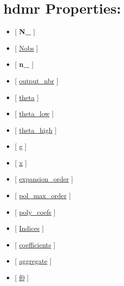 \documentclass[letterpaper,10pt,english]{sphinxmanual}
\begin{document}
\section{hdmr Properties:}
\label{classes/utils/@hdmr/hdmr:hdmr-properties}\begin{itemize}
\item {} 
{[} {\color{red}\bfseries{}N\_} {]}

\item {} 
{[} {\hyperref[classes/utils/@hdmr/hdmr:nobs]{Nobs}} {]}

\item {} 
{[} {\color{red}\bfseries{}n\_} {]}

\item {} 
{[} {\hyperref[classes/utils/@hdmr/hdmr:output-nbr]{output\_nbr}} {]}

\item {} 
{[} {\hyperref[classes/utils/@hdmr/hdmr:theta]{theta}} {]}

\item {} 
{[} {\hyperref[classes/utils/@hdmr/hdmr:theta-low]{theta\_low}} {]}

\item {} 
{[} {\hyperref[classes/utils/@hdmr/hdmr:theta-high]{theta\_high}} {]}

\item {} 
{[} {\hyperref[classes/utils/@hdmr/hdmr:g]{g}} {]}

\item {} 
{[} {\hyperref[classes/utils/@hdmr/hdmr:x]{x}} {]}

\item {} 
{[} {\hyperref[classes/utils/@hdmr/hdmr:expansion-order]{expansion\_order}} {]}

\item {} 
{[} {\hyperref[classes/utils/@hdmr/hdmr:pol-max-order]{pol\_max\_order}} {]}

\item {} 
{[} {\hyperref[classes/utils/@hdmr/hdmr:poly-coefs]{poly\_coefs}} {]}

\item {} 
{[} {\hyperref[classes/utils/@hdmr/hdmr:indices]{Indices}} {]}

\item {} 
{[} {\hyperref[classes/utils/@hdmr/hdmr:coefficients]{coefficients}} {]}

\item {} 
{[} {\hyperref[classes/utils/@hdmr/hdmr:aggregate]{aggregate}} {]}

\item {} 
{[} {\hyperref[classes/utils/@hdmr/hdmr:f0]{f0}} {]}


\end{itemize}
\end{document}
